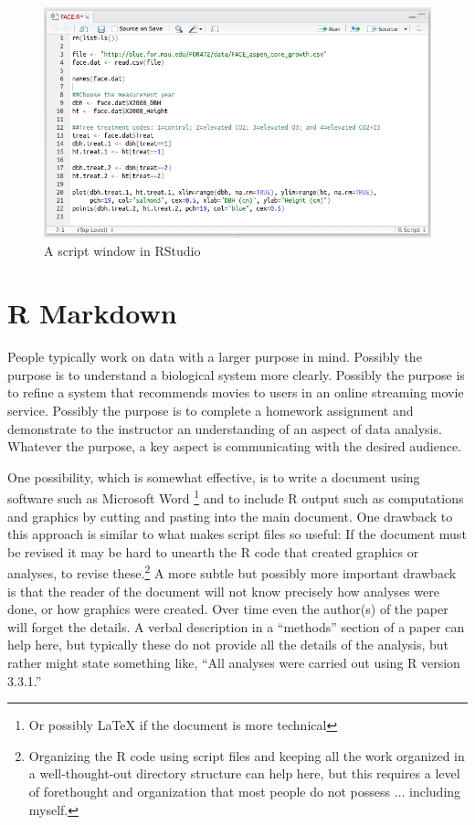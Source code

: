 \documentclass[]{krantz}
\theoremstyle{definition}
\theoremstyle{definition}
\theoremstyle{definition}
\theoremstyle{remark}
\begin{document}
\begin{figure}

{\centering \includegraphics[width=1\linewidth]{03-scripts/03-images/FACE-script-screenshot} 

}

\caption{A script window in RStudio}\label{fig:script}
\end{figure}

\section{R Markdown}\label{r-markdown}

People typically work on data with a larger purpose in mind. Possibly
the purpose is to understand a biological system more clearly. Possibly
the purpose is to refine a system that recommends movies to users in an
online streaming movie service. Possibly the purpose is to complete a
homework assignment and demonstrate to the instructor an understanding
of an aspect of data analysis. Whatever the purpose, a key aspect is
communicating with the desired audience.

One possibility, which is somewhat effective, is to write a document
using software such as Microsoft Word \footnote{Or possibly LaTeX if the
  document is more technical} and to include R output such as
computations and graphics by cutting and pasting into the main document.
One drawback to this approach is similar to what makes script files so
useful: If the document must be revised it may be hard to unearth the R
code that created graphics or analyses, to revise these.\footnote{Organizing
  the R code using script files and keeping all the work organized in a
  well-thought-out directory structure can help here, but this requires
  a level of forethought and organization that most people do not
  possess \(\ldots\) including myself.} A more subtle but possibly more
important drawback is that the reader of the document will not know
precisely how analyses were done, or how graphics were created. Over
time even the author(s) of the paper will forget the details. A verbal
description in a ``methods'' section of a paper can help here, but
typically these do not provide all the details of the analysis, but
rather might state something like, ``All analyses were carried out using
R version 3.3.1.''
\end{document}
